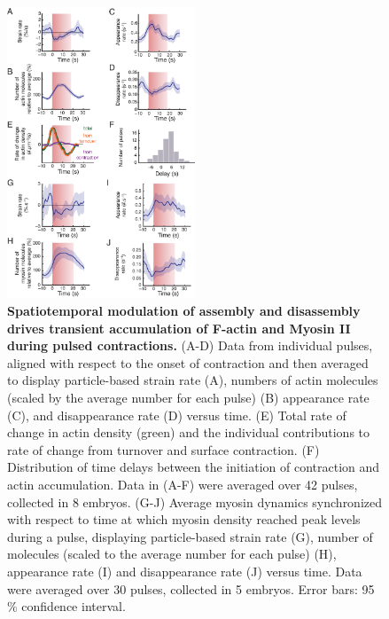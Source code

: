 \begin{figure}[!htbp]
\centering
\includegraphics[width=0.5\textwidth]{pulse/Figure2-3}

\caption[Spatiotemporal modulation of assembly and disassembly drives transient accumulation of F-actin and Myosin II during pulsed contractions.]{\label{fig:223} \textbf{Spatiotemporal modulation of assembly and disassembly drives transient accumulation of F-actin and Myosin II during pulsed contractions.} (A-D) Data from individual pulses, aligned with respect to the onset of contraction and then averaged to display particle-based strain rate (A), numbers of actin molecules (scaled by the average number for each pulse) (B) appearance rate (C), and disappearance rate (D) versus time.  (E) Total rate of change in actin density (green) and the individual contributions to rate of change from turnover and surface contraction. (F) Distribution of time delays between the initiation of contraction and actin accumulation. Data in (A-F) were averaged over 42 pulses, collected in 8 embryos. (G-J) Average myosin dynamics synchronized with respect to time at which myosin density reached peak levels during a pulse, displaying particle-based strain rate (G), number of molecules (scaled to the average number for each pulse) (H), appearance rate (I) and disappearance rate (J) versus time. Data were averaged over 30 pulses, collected in 5 embryos. Error bars: 95$\%$ confidence interval. }
\end{figure}



